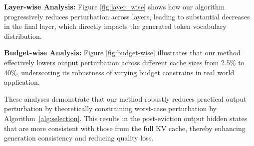 \textbf{Layer-wise Analysis:} Figure \ref{fig:layer_wise} shows how our algorithm progressively reduces perturbation across layers, leading to substantial decreases in the final layer, which directly impacts the generated token vocabulary distribution.


\textbf{Budget-wise Analysis:} Figure \ref{fig:budget-wise} illustrates that our method effectively lowers output perturbation across different cache sizes from 2.5\% to 40\%, underscoring its robustness of varying budget constrains in real world application.



These analyses demonstrate that our method robustly reduces practical output perturbation by theoretically constraining worst-case perturbation by Algorithm~\ref{alg:selection}. This results in the post-eviction output hidden states that are more consistent with those from the full KV cache, thereby enhancing generation consistency and reducing quality loss.



